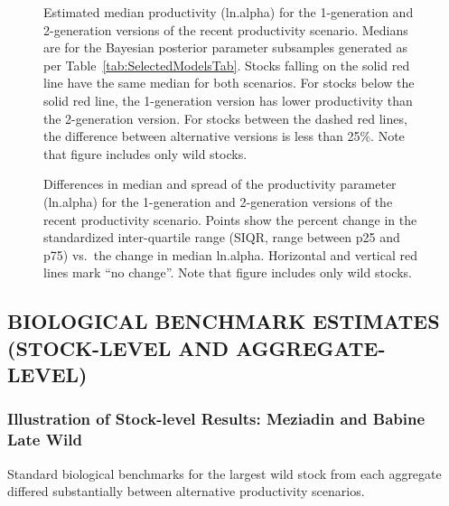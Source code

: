 \documentclass[french,11pt]{book}
\begin{document}
\begin{figure}[htb]

{\centering {} 

}

\caption{Estimated median productivity (ln.alpha) for the 1-generation and 2-generation versions of the recent productivity scenario. Medians are for the Bayesian posterior parameter subsamples generated as per Table~\ref{tab:SelectedModelsTab}. Stocks falling on the solid red line have the same median for both scenarios. For stocks below the solid red line, the 1-generation version has lower productivity than the 2-generation version. For stocks between the dashed red lines, the difference between alternative versions is less than 25\%. Note that figure includes only wild stocks.}\label{fig:ProdComp3}
\end{figure}
\clearpage


\begin{figure}[htb]

{\centering {} 

}

\caption{Differences in median and spread of the productivity parameter (ln.alpha) for the 1-generation and 2-generation versions of the recent productivity scenario. Points show the percent change in the standardized inter-quartile range (SIQR, range between p25 and p75) vs.~the change in median ln.alpha. Horizontal and vertical red lines mark ``no change''. Note that figure includes only wild stocks.}\label{fig:ProdComp4}
\end{figure}
\clearpage

\subsection{BIOLOGICAL BENCHMARK ESTIMATES (STOCK-LEVEL AND AGGREGATE-LEVEL)}\label{BMResults}

\subsubsection{Illustration of Stock-level Results: Meziadin and Babine Late Wild}\label{illustration-of-stock-level-results-meziadin-and-babine-late-wild}

Standard biological benchmarks for the largest wild stock from each aggregate differed substantially between alternative productivity scenarios.
\end{document}

